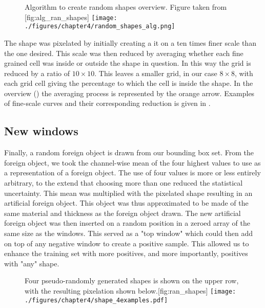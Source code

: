 \begin{figure}[h]
	\begin{sidecaption}{Algorithm to create random shapes overview. Figure taken from \cite{PythonCreateRandom}}[fig:alg_ran_shapes]
		\antimpjustification
		\centering
		\texttt{[image: ./figures/chapter4/random\_shapes\_alg.png]}
	\end{sidecaption}
\end{figure}

The shape was pixelated by initially creating a it on a ten times finer scale than the one desired. 
This scale was then reduced by averaging whether each fine grained cell was inside or outside the shape in question.
In this way the grid is reduced by a ratio of $10 \times 10$. 
This leaves a smaller grid, in our case $8\times 8$, with each grid cell giving the percentage to which the cell is inside the shape.
In the overview () the averaging process is represented by the orange arrow.
Examples of fine-scale curves and their corresponding reduction is given in .

\subsection{New windows}
Finally, a random foreign object is drawn from our bounding box set.
From the foreign object, we took the channel-wise mean of the four highest values to use as a representation of a foreign object.
The use of four values is more or less entirely arbitrary, to the extend that choosing more than one reduced the statistical uncertainty.
This mean was multiplied with the pixelated shape resulting in an artificial foreign object. 
This object was thus approximated to be made of the same material and thickness as the foreign object drawn.
The new artificial foreign object was then inserted on a random position in a zeroed array of the same size as the windows. 
This served as a "top window" which could then add on top of any negative window to create a positive sample.
This allowed us to enhance the training set with more positives, and more importantly, positives with "any" shape.

\begin{figure}[t]
	\begin{sidecaption}{Four pseudo-randomly generated shapes is shown on the upper row, with the resulting pixelation shown below.}[fig:ran_shapes]
		\antimpjustification
		\centering
		\texttt{[image: ./figures/chapter4/shape\_4examples.pdf]}
	\end{sidecaption}
\end{figure}

